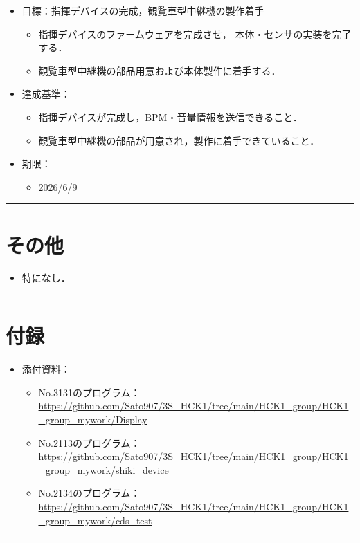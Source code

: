 \documentclass[uplatex,dvipdfmx,a4paper,11pt]{jsarticle}
\newcommand{\sectionrule}{\par\medskip\noindent\rule{\linewidth}{0.6pt}\par\medskip}
\begin{document}
\begin{itemize}

  \item 目標：指揮デバイスの完成，観覧車型中継機の製作着手
    \begin{itemize}
      \item 指揮デバイスのファームウェアを完成させ，
      本体・センサの実装を完了する．

      \item 観覧車型中継機の部品用意および本体製作に着手する．
    \end{itemize}

  \item 達成基準：
    \begin{itemize}
      \item 指揮デバイスが完成し，BPM・音量情報を送信できること．

      \item 観覧車型中継機の部品が用意され，製作に着手できていること．
    \end{itemize}

  \item 期限：
    \begin{itemize}
      \item 2026/6/9
    \end{itemize}

\end{itemize}


\sectionrule


\section{その他}

\begin{itemize}
  \item {}特になし．
\end{itemize}

\sectionrule


\section{付録}

\begin{itemize}
  \item 添付資料：
    \begin{itemize}
      \item No.3131のプログラム：\url{https://github.com/Sato907/3S_HCK1/tree/main/HCK1_group/HCK1_group_mywork/Display}
      \item No.2113のプログラム：\url{https://github.com/Sato907/3S_HCK1/tree/main/HCK1_group/HCK1_group_mywork/shiki_device}
      \item No.2134のプログラム：\url{https://github.com/Sato907/3S_HCK1/tree/main/HCK1_group/HCK1_group_mywork/cds_test}

    \end{itemize}

\end{itemize}

\sectionrule
\end{document}
